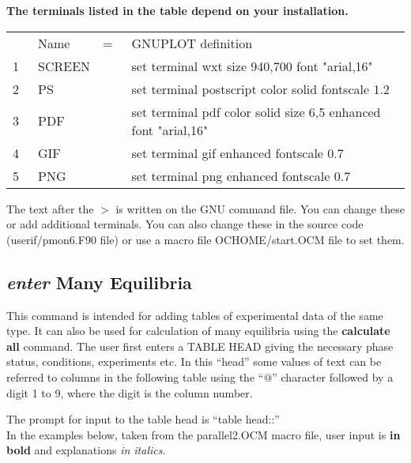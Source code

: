 \documentclass[11pt]{article}
\begin{document}

{\bf The terminals listed in the table depend on your installation.}

\begin{tabular}{rlcl}
  & Name   &=~& GNUPLOT definition\\
 1~& SCREEN & & set terminal wxt size 940,700 font "arial,16"\\
 2~& PS     & & set terminal postscript color solid fontscale 1.2\\
 3~& PDF    & & set terminal pdf color solid size 6,5 enhanced font "arial,16"\\
 4~& GIF    & & set terminal gif enhanced fontscale 0.7\\
 5~& PNG    & & set terminal png enhanced fontscale 0.7\\
\end{tabular}

The text after the $>$ is written on the GNU command file.  You can
change these or add additional terminals.  You can also change these
in the source code (userif/pmon6.F90 file) or use a macro file
OCHOME/start.OCM file to set them.

\hypertarget{Enter many equil}{}
\subsection{{\em enter} Many Equilibria}\label{sc:entermany}

This command is intended for adding tables of experimental data of the
same type.  It can also be used for calculation of many equilibria
using the {\bf calculate all} command.  The user first enters a TABLE
HEAD giving the necessary phase status, conditions, experiments etc.
In this ``head'' some values of text can be referred to columns in the
following table using the ``@'' character followed by a digit 1 to 9,
where the digit is the column number.

The prompt for input to the table head is ``table head::''\\ In the
examples below, taken from the parallel2.OCM macro file, user input is
{\bf in bold} and explanations {\em in italics}.
\end{document}
